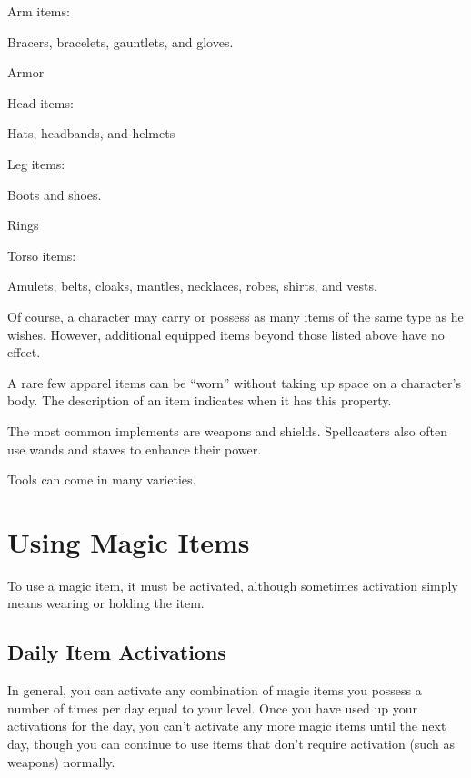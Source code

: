 \begin{itemize*}
  \item Arm items:
    \begin{itemize*}
      \item Bracers, bracelets, gauntlets, and gloves.
    \end{itemize*}
  \item Armor
  \item Head items:
    \begin{itemize*}
      \item Hats, headbands, and helmets
    \end{itemize*}
  \item Leg items:
    \begin{itemize*}
      \item Boots and shoes.
    \end{itemize*}
  \item Rings
  \item Torso items:
    \begin{itemize*}
      \item Amulets, belts, cloaks, mantles, necklaces, robes, shirts, and vests.
    \end{itemize*}
\end{itemize*}

Of course, a character may carry or possess as many items of the same type as he wishes. However, additional equipped items beyond those listed above have no effect.

A rare few apparel items can be ``worn'' without taking up space on a character's body. The description of an item indicates when it has this property.

 The most common implements are weapons and shields. Spellcasters also often use wands and staves to enhance their power.

 Tools can come in many varieties.

\section{Using Magic Items}

To use a magic item, it must be activated, although sometimes activation simply means wearing or holding the item.

\subsection{Daily Item Activations}
In general, you can activate any combination of magic items you possess a number of times per day equal to your level. Once you have used up your activations for the day, you can't activate any more magic items until the next day, though you can continue to use items that don't require activation (such as weapons) normally.

